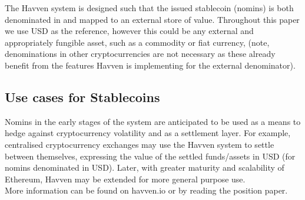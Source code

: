 \noindent The Havven system is designed such that the issued stablecoin (nomins) is both denominated in and
mapped to an external store of value. Throughout this paper we use USD as the reference, however this could
be any external and appropriately fungible asset, such as a commodity or fiat currency, (note, denominations
in other cryptocurrencies are not necessary as these already benefit from the features Havven is implementing
for the external denominator). \\

\subsection{Use cases for Stablecoins}

\noindent Nomins in the early stages of the system are anticipated to be used as a means to hedge against
cryptocurrency volatility and as a settlement layer. For example, centralised cryptocurrency exchanges may
use the Havven system to settle between themselves, expressing the value of the settled funds/assets in USD
(for nomins denominated in USD). Later, with greater maturity and scalability of Ethereum, Havven may be
extended for more general purpose use. \\


\noindent More information can be found on havven.io or by reading the position paper.

\pagebreak
